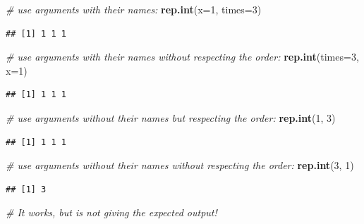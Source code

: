 \documentclass[]{book}
\newenvironment{Shaded}{\begin{snugshade}}{\end{snugshade}}
\newcommand{\CommentTok}[1]{\textcolor[rgb]{0.56,0.35,0.01}{\textit{#1}}}
\newcommand{\DataTypeTok}[1]{\textcolor[rgb]{0.13,0.29,0.53}{#1}}
\newcommand{\DecValTok}[1]{\textcolor[rgb]{0.00,0.00,0.81}{#1}}
\newcommand{\KeywordTok}[1]{\textcolor[rgb]{0.13,0.29,0.53}{\textbf{#1}}}
\newcommand{\NormalTok}[1]{#1}
\begin{document}
\begin{Shaded}
\begin{Highlighting}[]
\CommentTok{# use arguments with their names:}
\KeywordTok{rep.int}\NormalTok{(}\DataTypeTok{x=}\DecValTok{1}\NormalTok{, }\DataTypeTok{times=}\DecValTok{3}\NormalTok{)}
\end{Highlighting}
\end{Shaded}

\begin{verbatim}
## [1] 1 1 1
\end{verbatim}

\begin{Shaded}
\begin{Highlighting}[]
\CommentTok{# use arguments with their names without respecting the order:}
\KeywordTok{rep.int}\NormalTok{(}\DataTypeTok{times=}\DecValTok{3}\NormalTok{, }\DataTypeTok{x=}\DecValTok{1}\NormalTok{)}
\end{Highlighting}
\end{Shaded}

\begin{verbatim}
## [1] 1 1 1
\end{verbatim}

\begin{Shaded}
\begin{Highlighting}[]
\CommentTok{# use arguments without their names but respecting the order:}
\KeywordTok{rep.int}\NormalTok{(}\DecValTok{1}\NormalTok{, }\DecValTok{3}\NormalTok{)}
\end{Highlighting}
\end{Shaded}

\begin{verbatim}
## [1] 1 1 1
\end{verbatim}

\begin{Shaded}
\begin{Highlighting}[]
\CommentTok{# use arguments without their names without respecting the order:}
\KeywordTok{rep.int}\NormalTok{(}\DecValTok{3}\NormalTok{, }\DecValTok{1}\NormalTok{)}
\end{Highlighting}
\end{Shaded}

\begin{verbatim}
## [1] 3
\end{verbatim}

\begin{Shaded}
\begin{Highlighting}[]
\CommentTok{# It works, but is not giving the expected output!}
\end{Highlighting}
\end{Shaded}
\end{document}

